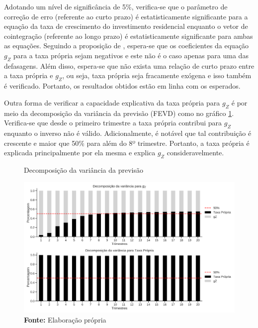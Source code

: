 Adotando um nível de significância de 5\%, verifica-se que o parâmetro de correção de erro (referente ao curto prazo) é estatisticamente significante para a equação da taxa de crescimento do investimento residencial enquanto o vetor de cointegração (referente ao longo prazo) é estatisticamente significante para ambas as equações. Seguindo a proposição de \textcite{teixeira_crescimento_2015}, espera-se que os coeficientes da equação $g_Z$ para a taxa própria sejam negativos e este não é o caso apenas para uma das defasagens. Além disso, espera-se que não exista uma relação de curto prazo entre a taxa própria e $g_Z$, ou seja, taxa própria seja fracamente exógena e isso também é verificado. Portanto, os resultados obtidos estão em linha com os esperados. 

Outra forma de verificar a capacidade explicativa da taxa própria para $g_Z$ é por meio da decomposição da variância da previsão (FEVD) como no gráfico \ref{fevd}. Verifica-se que desde o primeiro trimestre a taxa própria contribui para $g_Z$ enquanto o inverso não é válido. Adicionalmente, é notável que tal contribuição é crescente e maior que 50\% para além do 8º trimestre. Portanto, a taxa própria é explicada principalmente por ela mesma e explica $g_Z$ consideravelmente.

\begin{figure}[htb]
	\centering
	\caption{Decomposição da variância da previsão}
	\label{fevd}
	\includegraphics[width=\textwidth]{Fatos_Estilizados/Figs/FEVD_VECM.png}
	\caption*{\textbf{Fonte:} Elaboração própria}
\end{figure}


